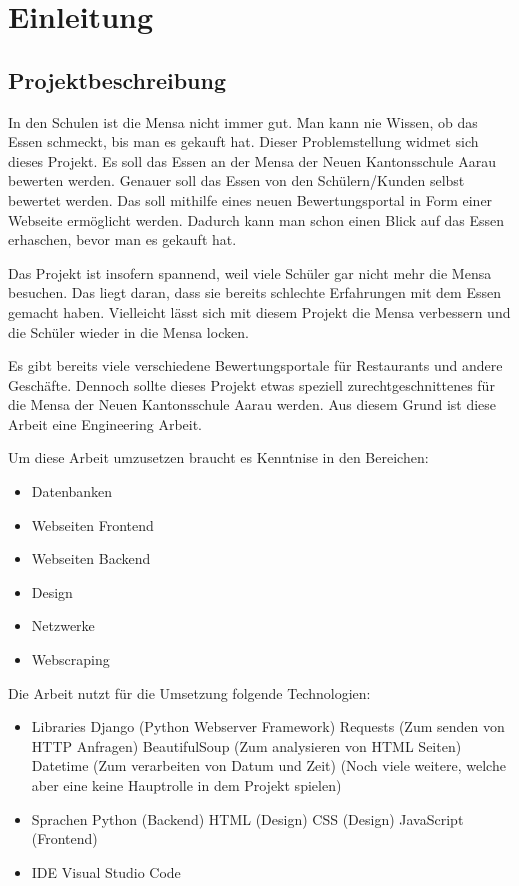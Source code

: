 \chapter{Einleitung}\label{chap:einleit}
\section{Projektbeschreibung}\label{sec:projektbeschreibung}

In den Schulen ist die Mensa nicht immer gut. Man kann nie Wissen, ob das Essen
schmeckt, bis man es gekauft hat. Dieser Problemstellung widmet sich dieses
Projekt. Es soll das Essen an der Mensa der Neuen Kantonsschule Aarau bewerten
werden. Genauer soll das Essen von den Schülern/Kunden selbst bewertet werden.
Das soll mithilfe eines neuen Bewertungsportal in Form einer Webseite ermöglicht
werden. Dadurch kann man schon einen Blick auf das Essen erhaschen, bevor man es
gekauft hat.

Das Projekt ist insofern spannend, weil viele Schüler gar nicht mehr die Mensa
besuchen. Das liegt daran, dass sie bereits schlechte Erfahrungen mit dem Essen
gemacht haben. Vielleicht lässt sich mit diesem Projekt die Mensa verbessern und
die Schüler wieder in die Mensa locken.

Es gibt bereits viele verschiedene Bewertungsportale für Restaurants und
andere Geschäfte. Dennoch sollte dieses Projekt etwas speziell
zurechtgeschnittenes für die Mensa der Neuen Kantonsschule Aarau werden.
Aus diesem Grund ist diese Arbeit eine Engineering Arbeit.
 
\newpage

Um diese Arbeit umzusetzen braucht es Kenntnise in den Bereichen:
\begin{itemize}
    \item Datenbanken
    \item Webseiten Frontend
    \item Webseiten Backend
    \item Design
    \item Netzwerke
    \item Webscraping
\end{itemize}

Die Arbeit nutzt für die Umsetzung folgende Technologien:
\begin{itemize}
    \item Libraries
    \subitem Django (Python Webserver Framework)
    \subitem Requests  (Zum senden von HTTP Anfragen)
    \subitem BeautifulSoup  (Zum analysieren von HTML Seiten)
    \subitem Datetime (Zum verarbeiten von Datum und Zeit)
    \subitem (Noch viele weitere, welche aber eine keine Hauptrolle in dem Projekt spielen)
    \item Sprachen
    \subitem Python (Backend)
    \subitem HTML (Design)
    \subitem CSS (Design)
    \subitem JavaScript (Frontend)
    \item IDE
    \subitem Visual Studio Code
\end{itemize}

